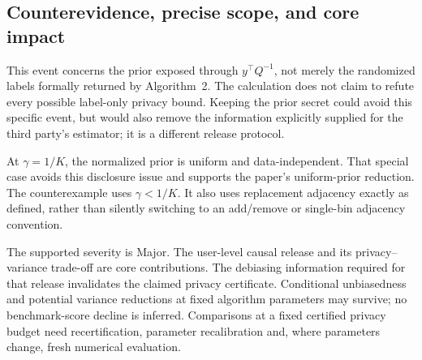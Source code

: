 \documentclass[10pt]{article}
\begin{document}
\subsection*{Counterevidence, precise scope, and core impact}
This event concerns the prior exposed through \(y^\top Q^{-1}\), not merely the randomized labels formally returned by Algorithm 2. The calculation does not claim to refute every possible label-only privacy bound. Keeping the prior secret could avoid this specific event, but would also remove the information explicitly supplied for the third party’s estimator; it is a different release protocol.\par
At \(\gamma=1/K\), the normalized prior is uniform and data-independent. That special case avoids this disclosure issue and supports the paper’s uniform-prior reduction. The counterexample uses \(\gamma<1/K\). It also uses replacement adjacency exactly as defined, rather than silently switching to an add/remove or single-bin adjacency convention.\par
The supported severity is Major. The user-level causal release and its privacy–variance trade-off are core contributions. The debiasing information required for that release invalidates the claimed privacy certificate. Conditional unbiasedness and potential variance reductions at fixed algorithm parameters may survive; no benchmark-score decline is inferred. Comparisons at a fixed certified privacy budget need recertification, parameter recalibration and, where parameters change, fresh numerical evaluation.\par
\end{document}
